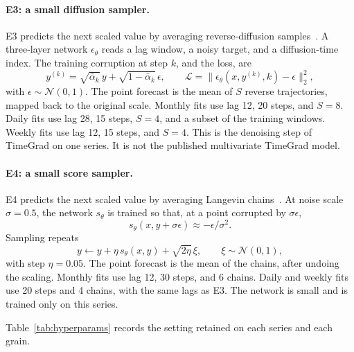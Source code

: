 \paragraph{E3: a small diffusion sampler.}
E3 predicts the next scaled value by averaging reverse-diffusion samples~\citep{rasul2021timegrad}.
A three-layer network $\epsilon_{\theta}$ reads a lag window, a noisy target, and a diffusion-time index.
The training corruption at step $k$, and the loss, are
\begin{equation}
  y^{(k)} = \sqrt{\bar\alpha_k}\, y + \sqrt{1 - \bar\alpha_k}\,\epsilon,
  \qquad
  \mathcal{L}
  = \bigl\|\epsilon_{\theta}(x, y^{(k)}, k) - \epsilon\bigr\|_2^2,
  \label{eq:ddpm}
\end{equation}
with $\epsilon \sim \mathcal{N}(0,1)$.
The point forecast is the mean of $S$ reverse trajectories, mapped back to the original scale.
Monthly fits use lag 12, 20 steps, and $S = 8$.
Daily fits use lag 28, 15 steps, $S = 4$, and a subset of the training windows.
Weekly fits use lag 12, 15 steps, and $S = 4$.
This is the denoising step of TimeGrad on one series.
It is not the published multivariate TimeGrad model.

\paragraph{E4: a small score sampler.}
E4 predicts the next scaled value by averaging Langevin chains~\citep{song2019score}.
At noise scale $\sigma = 0.5$, the network $s_{\theta}$ is trained so that, at a point corrupted by $\sigma\epsilon$,
\begin{equation}
  s_{\theta}(x, y + \sigma\epsilon) \approx -\epsilon / \sigma^{2}.
  \label{eq:score-target}
\end{equation}
Sampling repeats
\begin{equation}
  y \leftarrow y + \eta\, s_{\theta}(x, y) + \sqrt{2\eta}\,\xi,
  \qquad
  \xi \sim \mathcal{N}(0,1),
  \label{eq:langevin}
\end{equation}
with step $\eta = 0.05$.
The point forecast is the mean of the chains, after undoing the scaling.
Monthly fits use lag 12, 30 steps, and 6 chains.
Daily and weekly fits use 20 steps and 4 chains, with the same lags as E3.
The network is small and is trained only on this series.

\clearpage
Table~\ref{tab:hyperparams} records the setting retained on each series and each grain.


